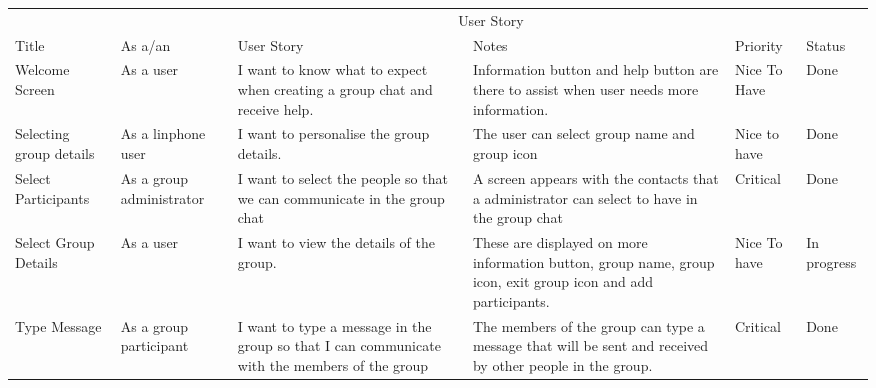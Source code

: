 \documentclass[a4paper]{article}
\begin{document}
\vspace{\baselineskip}
\begin{table} 
\begin{tabular}{p{1.5cm} p{2.5cm} p{3cm} p{3cm} p{1cm} p{1cm}} %
\hline %
& \multicolumn{5}{c}{User Story} \\ %
\cmidrule(l){2-6} %
Title & As a/an & User Story & Notes & Priority & Status\\ %
\hline %

Welcome Screen & As a user & I want to know what to expect when creating a group chat and receive help. & Information button and help button are there to assist when user needs more information. & Nice To Have & Done\\  \cmidrule(l){2-6}%

Selecting group details & As a linphone user & I want to personalise the group details.  & The user can select group name and group icon & Nice to have & Done\\ \cmidrule(l){2-6}%


Select Participants & As a group administrator & I want to select the people so that we can communicate in the group chat  & A screen appears with the contacts that a administrator can select to have in the group chat & Critical & Done\\ \cmidrule(l){2-6}%

Select Group Details & As a user & I want to view the details of the group. & These are displayed on more information button, group name, group icon, exit group icon and add participants. & Nice To have & In progress\\ \cmidrule(l){2-6}%


Type Message & As a group participant & I want to type a message in the group so that I can communicate with the members of the group& The members of the group can type a message that will be sent and received by other people in the group. & Critical & Done\\ \cmidrule(l){2-6} %


\end{tabular}
\end{table}
\end{document}
